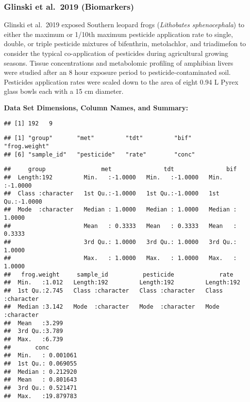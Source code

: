 \documentclass[
]{article}
\begin{document}
\hypertarget{glinski-et-al.-2019-biomarkers}{%
\subsubsection{Glinski et al.~2019
(Biomarkers)}\label{glinski-et-al.-2019-biomarkers}}

Glinski et al.~2019 exposed Southern leopard frogs (\emph{Lithobates
sphenocephala}) to either the maximum or 1/10th maximum pesticide
application rate to single, double, or triple pesticide mixtures of
bifenthrin, metolachlor, and triadimefon to consider the typical
co-application of pesticides during agricultural growing seasons. Tissue
concentrations and metabolomic profiling of amphibian livers were
studied after an 8 hour exposure period to pesticide-contaminated soil.
Pesticides application rates were scaled down to the area of eight 0.94
L Pyrex glass bowls each with a 15 cm diameter.

\textbf{Data Set Dimensions, Column Names, and Summary:}

\begin{verbatim}
## [1] 192   9
\end{verbatim}

\begin{verbatim}
## [1] "group"       "met"         "tdt"         "bif"         "frog.weight"
## [6] "sample_id"   "pesticide"   "rate"        "conc"
\end{verbatim}

\begin{verbatim}
##     group                met               tdt               bif         
##  Length:192         Min.   :-1.0000   Min.   :-1.0000   Min.   :-1.0000  
##  Class :character   1st Qu.:-1.0000   1st Qu.:-1.0000   1st Qu.:-1.0000  
##  Mode  :character   Median : 1.0000   Median : 1.0000   Median : 1.0000  
##                     Mean   : 0.3333   Mean   : 0.3333   Mean   : 0.3333  
##                     3rd Qu.: 1.0000   3rd Qu.: 1.0000   3rd Qu.: 1.0000  
##                     Max.   : 1.0000   Max.   : 1.0000   Max.   : 1.0000  
##   frog.weight     sample_id          pesticide             rate          
##  Min.   :1.012   Length:192         Length:192         Length:192        
##  1st Qu.:2.745   Class :character   Class :character   Class :character  
##  Median :3.142   Mode  :character   Mode  :character   Mode  :character  
##  Mean   :3.299                                                           
##  3rd Qu.:3.789                                                           
##  Max.   :6.739                                                           
##       conc          
##  Min.   : 0.001061  
##  1st Qu.: 0.069055  
##  Median : 0.212920  
##  Mean   : 0.801643  
##  3rd Qu.: 0.521471  
##  Max.   :19.879783
\end{verbatim}
\end{document}
